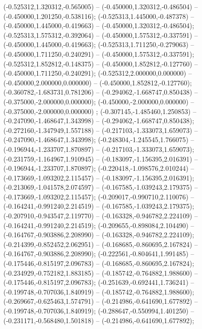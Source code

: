  (-0.525312,1.320312,-0.565005) -- (-0.450000,1.320312,-0.486504) -- (-0.450000,1.201250,-0.538116);
 (-0.525313,1.445000,-0.487378) -- (-0.450000,1.445000,-0.419663) -- (-0.450000,1.320312,-0.486504);
 (-0.525313,1.575312,-0.392064) -- (-0.450000,1.575312,-0.337591) -- (-0.450000,1.445000,-0.419663);
 (-0.525313,1.711250,-0.279063) -- (-0.450000,1.711250,-0.240291) -- (-0.450000,1.575312,-0.337591);
 (-0.525312,1.852812,-0.148375) -- (-0.450000,1.852812,-0.127760) -- (-0.450000,1.711250,-0.240291);
 (-0.525312,2.000000,0.000000) -- (-0.450000,2.000000,0.000000) -- (-0.450000,1.852812,-0.127760);
 (-0.360782,-1.683731,0.781206) -- (-0.294062,-1.668747,0.850438) -- (-0.375000,-2.000000,0.000000);
 (-0.450000,-2.000000,0.000000) -- (-0.375000,-2.000000,0.000000) ;
 (-0.307145,-1.485460,1.250853) -- (-0.247090,-1.468647,1.343998) -- (-0.294062,-1.668747,0.850438);
 (-0.272160,-1.347949,1.557188) -- (-0.217103,-1.333073,1.659073) -- (-0.247090,-1.468647,1.343998);
 (-0.248304,-1.245545,1.766075) -- (-0.196944,-1.233707,1.870897) -- (-0.217103,-1.333073,1.659073);
 (-0.231759,-1.164967,1.910945) -- (-0.183097,-1.156395,2.016391) -- (-0.196944,-1.233707,1.870897);
 (-0.220418,-1.098576,2.010244) -- (-0.173669,-1.093202,2.115457) -- (-0.183097,-1.156395,2.016391);
 (-0.213069,-1.041578,2.074597) -- (-0.167585,-1.039243,2.179375) -- (-0.173669,-1.093202,2.115457);
 (-0.209017,-0.990710,2.110076) -- (-0.164241,-0.991240,2.214519) -- (-0.167585,-1.039243,2.179375);
 (-0.207910,-0.943547,2.119770) -- (-0.163328,-0.946782,2.224109) -- (-0.164241,-0.991240,2.214519);
 (-0.209655,-0.898084,2.104490) -- (-0.164767,-0.903886,2.208990) -- (-0.163328,-0.946782,2.224109);
 (-0.214399,-0.852452,2.062951) -- (-0.168685,-0.860695,2.167824) -- (-0.164767,-0.903886,2.208990);
 (-0.222561,-0.804641,1.991485) -- (-0.175446,-0.815197,2.096783) -- (-0.168685,-0.860695,2.167824);
 (-0.234929,-0.752182,1.883185) -- (-0.185742,-0.764882,1.988600) -- (-0.175446,-0.815197,2.096783);
 (-0.251639,-0.692441,1.736241) -- (-0.199748,-0.707036,1.840919) -- (-0.185742,-0.764882,1.988600);
 (-0.269667,-0.625463,1.574791) -- (-0.214986,-0.641690,1.677892) -- (-0.199748,-0.707036,1.840919);
 (-0.288647,-0.550994,1.401250) -- (-0.231171,-0.568480,1.501818) -- (-0.214986,-0.641690,1.677892);
